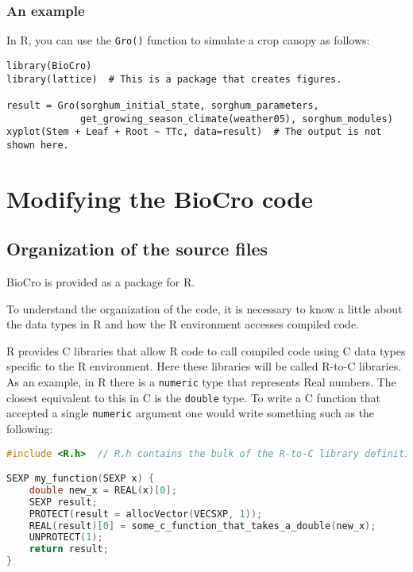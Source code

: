 \documentclass{article}
\newcommand{\code}[1]{\texttt{#1}}
\begin{document}
\subsubsection{An example}
In R, you can use the \code{Gro()} function to simulate  a crop canopy as follows:
% 
% 
\begin{center}
\begin{lstlisting}
library(BioCro)
library(lattice)  # This is a package that creates figures.

result = Gro(sorghum_initial_state, sorghum_parameters,
             get_growing_season_climate(weather05), sorghum_modules)
xyplot(Stem + Leaf + Root ~ TTc, data=result)  # The output is not shown here.
\end{lstlisting}
\end{center}

\section{Modifying the BioCro code}
\subsection{Organization of the source files}
BioCro is provided as a package for R. 

To understand the organization of the code, it is necessary to know a little about the data types in R and how the R environment accesses compiled code.

R provides C libraries that allow R code to call compiled code using C data types specific to the R environment. Here these libraries will be called R-to-C libraries. As an example, in R there is a \code{numeric} type that represents Real numbers. The closest equivalent to this in C is the \code{double} type. To write a C function that accepted a single \code{numeric} argument one would write something such as the following:

\begin{center}
\begin{lstlisting}[language=c]
#include <R.h>  // R.h contains the bulk of the R-to-C library definitions.

SEXP my_function(SEXP x) {
    double new_x = REAL(x)[0];
    SEXP result;
    PROTECT(result = allocVector(VECSXP, 1));
    REAL(result)[0] = some_c_function_that_takes_a_double(new_x);
    UNPROTECT(1);
    return result;
}
\end{lstlisting}
\end{center}
\end{document}
